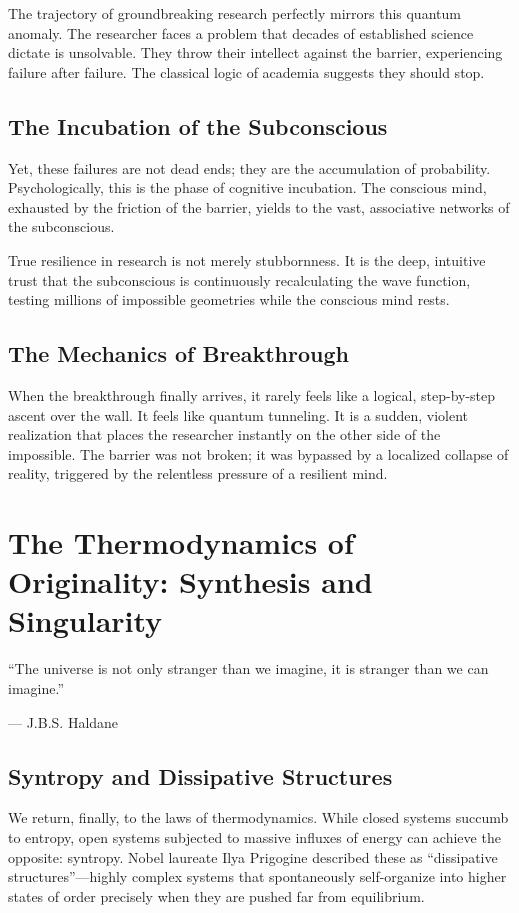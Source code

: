 \documentclass[11pt,a4paper,oneside]{book}
\theoremstyle{definition}
\theoremstyle{remark}
\begin{document}
The trajectory of groundbreaking research perfectly mirrors this quantum anomaly. The researcher faces a problem that decades of established science dictate is unsolvable. They throw their intellect against the barrier, experiencing failure after failure. The classical logic of academia suggests they should stop.

\section{The Incubation of the Subconscious}
Yet, these failures are not dead ends; they are the accumulation of probability. Psychologically, this is the phase of cognitive incubation. The conscious mind, exhausted by the friction of the barrier, yields to the vast, associative networks of the subconscious. 

True resilience in research is not merely stubbornness. It is the deep, intuitive trust that the subconscious is continuously recalculating the wave function, testing millions of impossible geometries while the conscious mind rests. 

\section{The Mechanics of Breakthrough}
When the breakthrough finally arrives, it rarely feels like a logical, step-by-step ascent over the wall. It feels like quantum tunneling. It is a sudden, violent realization that places the researcher instantly on the other side of the impossible. The barrier was not broken; it was bypassed by a localized collapse of reality, triggered by the relentless pressure of a resilient mind. 

\chapter{The Thermodynamics of Originality: Synthesis and Singularity}
\epigraph{``The universe is not only stranger than we imagine, it is stranger than we can imagine.''}{--- J.B.S. Haldane}

\section{Syntropy and Dissipative Structures}
We return, finally, to the laws of thermodynamics. While closed systems succumb to entropy, open systems subjected to massive influxes of energy can achieve the opposite: syntropy. Nobel laureate Ilya Prigogine described these as ``dissipative structures''---highly complex systems that spontaneously self-organize into higher states of order precisely when they are pushed far from equilibrium.
\end{document}

